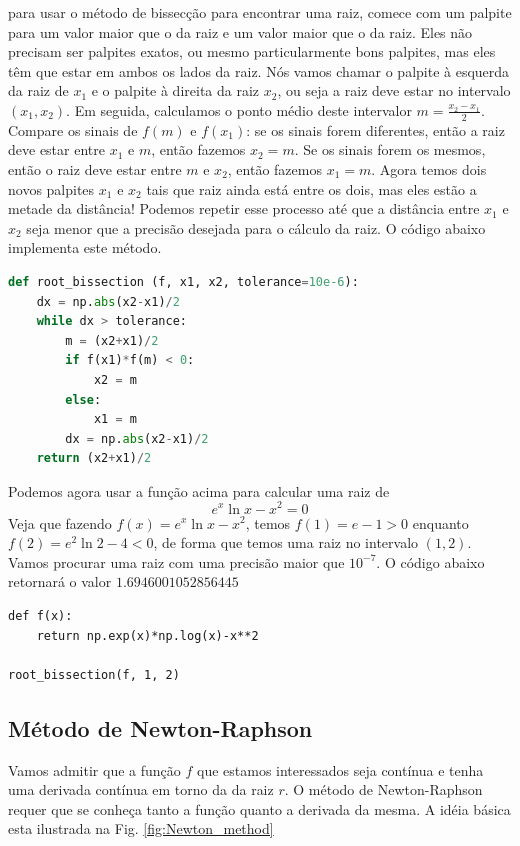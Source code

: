 para usar o método de bissecção para encontrar uma raiz, comece com um palpite para um valor maior que o da raiz e um valor maior que o da raiz. Eles não precisam ser palpites exatos, ou mesmo particularmente bons palpites, mas eles têm que estar em ambos os lados da raiz. Nós vamos chamar o palpite à esquerda da raiz de $x_1$ e o palpite à direita da raiz $x_2$, ou seja a raiz deve estar no intervalo $(x_1, x_2)$. Em seguida, calculamos o ponto médio deste intervalor $m = \frac{x_2 - x_1}{2}$. Compare os sinais de $f(m)$ e $f(x_1)$: se os sinais forem diferentes, então a raiz deve estar entre $x_1$ e $m$, então fazemos $x_2 = m$. Se os sinais forem os mesmos, então o raiz deve estar entre $m$ e $x_2$, então fazemos $x_1 = m$. Agora temos dois novos palpites $x_1$ e $x_2$ tais que raiz ainda está entre os dois, mas eles estão a metade da distância! Podemos repetir esse processo até que a distância entre $x_1$ e $x_2$ seja menor que a precisão desejada para o cálculo da raiz. O código abaixo implementa este método.

\begin{lstlisting}[language=Python, frame=lines,basicstyle=\footnotesize, caption={Método da Bisecção para cálculo de raizes}, label={lst:bisection}]
def root_bissection (f, x1, x2, tolerance=10e-6):
    dx = np.abs(x2-x1)/2
    while dx > tolerance:
        m = (x2+x1)/2 
        if f(x1)*f(m) < 0:
            x2 = m
        else:
            x1 = m
        dx = np.abs(x2-x1)/2
    return (x2+x1)/2
\end{lstlisting}

Podemos agora usar a função acima para calcular uma raiz de
\[e^x \ln x - x^2 = 0 \]
Veja que fazendo $f(x) = e^x \ln x - x^2$, temos $f(1)=e-1 > 0$ enquanto $f(2)= e^2 \ln 2 - 4<0$, de forma que temos uma raiz no intervalo $(1,2)$. Vamos procurar uma raiz com uma precisão maior que $10^{-7}$. O código abaixo retornará o valor $1.6946001052856445$
\begin{lstlisting}
def f(x):
    return np.exp(x)*np.log(x)-x**2
    
root_bissection(f, 1, 2)
\end{lstlisting}

\subsection{Método de Newton-Raphson}
    
Vamos admitir que a função $f$ que estamos interessados seja contínua e tenha uma derivada contínua em torno da da raiz $r$. O método de Newton-Raphson requer que se conheça tanto a função quanto a derivada da mesma. A idéia básica esta ilustrada na Fig. \ref{fig:Newton_method}

